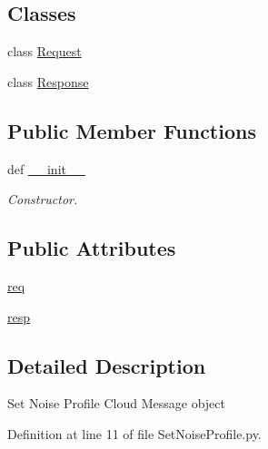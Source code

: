 \subsection*{Classes}
\begin{DoxyCompactItemize}
\item 
class \hyperlink{classRappCloud_1_1CloudMsgs_1_1SetNoiseProfile_1_1SetNoiseProfile_1_1Request}{Request}
\item 
class \hyperlink{classRappCloud_1_1CloudMsgs_1_1SetNoiseProfile_1_1SetNoiseProfile_1_1Response}{Response}
\end{DoxyCompactItemize}
\subsection*{Public Member Functions}
\begin{DoxyCompactItemize}
\item 
def \hyperlink{classRappCloud_1_1CloudMsgs_1_1SetNoiseProfile_1_1SetNoiseProfile_a80326d1ce36f4c614d0bee6f8c22b1b2}{\-\_\-\-\_\-init\-\_\-\-\_\-}
\begin{DoxyCompactList}\small\item\em Constructor. \end{DoxyCompactList}\end{DoxyCompactItemize}
\subsection*{Public Attributes}
\begin{DoxyCompactItemize}
\item 
\hyperlink{classRappCloud_1_1CloudMsgs_1_1SetNoiseProfile_1_1SetNoiseProfile_aed9faf7230b06d3ed1e705ab66202195}{req}
\item 
\hyperlink{classRappCloud_1_1CloudMsgs_1_1SetNoiseProfile_1_1SetNoiseProfile_a8b6882752baa8ce97e0a11cd534405f2}{resp}
\end{DoxyCompactItemize}


\subsection{Detailed Description}
\begin{DoxyVerb}Set Noise Profile Cloud Message object \end{DoxyVerb}
 

Definition at line 11 of file Set\-Noise\-Profile.\-py.



